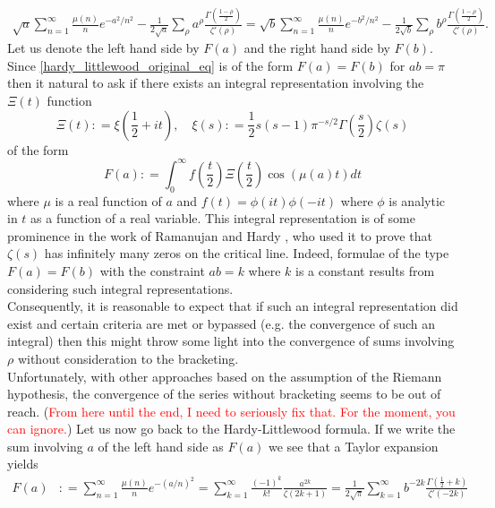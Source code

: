 \documentclass[11pt]{article}
\numberwithin{equation}{section}		 			%
\numberwithin{figure}{section}			 			%
\begin{document}
\begin{align} \label{dixit_equivalent}
\sqrt a \sum\limits_{n = 1}^\infty  {\frac{{\mu (n)}}
{n}e^{ - a^2 /n^2 } }  - \frac{1}
{{2\sqrt a }}\sum\limits_\rho  {a^\rho  \frac{{\Gamma (\tfrac{{1 - \rho }}
{2})}}
{{\zeta '(\rho )}}}  = \sqrt b \sum\limits_{n = 1}^\infty  {\frac{{\mu (n)}}
{n}e^{ - b^2 /n^2 } }  - \frac{1}
{{2\sqrt b }}\sum\limits_\rho  {b^\rho  \frac{{\Gamma (\tfrac{{1 - \rho }}
{2})}}
{{\zeta '(\rho )}}}.
\end{align}
Let us denote the left hand side by $F(a)$ and the right hand side by $F(b)$. Since \eqref{hardy_littlewood_original_eq} is of the form $F(a)=F(b)$ for $ab = \pi$ then it natural to ask if there exists an integral representation involving the $\Xi(t)$ function
\[
\Xi (t): = \xi \left( {\frac{1}
{2} + it} \right),\quad \xi (s): = \frac{1}
{2}s(s - 1)\pi ^{ - s/2} \Gamma \left( {\frac{s}
{2}} \right)\zeta (s)
\]
of the form
\[
F(a): = \int_0^\infty  {f\left( {\frac{t}
{2}} \right)\Xi \left( {\frac{t}
{2}} \right)\cos (\mu (a)t)dt} 
\]
where $\mu$ is a real function of $a$ and $f(t)=\phi(it)\phi(-it)$ where $\phi$ is analytic in $t$ as a function of a real variable. This integral representation is of some prominence in the work of Ramanujan \cite{ramanujan_32} and Hardy \cite{hardy}, \cite{titchmarsh} who used it to prove that $\zeta(s)$ has infinitely many zeros on the critical line. Indeed, formulae of the type $F(a)=F(b)$ with the constraint $ab = k$ where $k$ is a constant results from considering such integral representations.\\
Consequently, it is reasonable to expect that if such an integral representation did exist and certain criteria are met or bypassed (e.g. the convergence of such an integral) then this might \cite{dixit_1} throw some light into the convergence of sums involving $\rho$ without consideration to the bracketing.\\
Unfortunately, with other approaches \cite{hardy_littlewood} based on the assumption of the Riemann hypothesis, the convergence of the series without bracketing seems to be out of reach.
(\textcolor{red}{From here until the end, I need to seriously fix that. For the moment, you can ignore.}) Let us now go back to the Hardy-Littlewood formula. If we write the sum involving $a$ of the left hand side as $F(a)$ we see that a Taylor expansion yields
\begin{align} \label{derivative_minus_even_integers}
  F(a) &: = \sum\limits_{n = 1}^\infty  {\frac{{\mu (n)}}
{n}e^{ - (a/n)^2 } } = \sum\limits_{k = 1}^\infty  {\frac{{( - 1)^k }}
{{k!}}\frac{{a^{2k} }}
{{\zeta (2k + 1)}}}  = \frac{1}
{{2\sqrt \pi  }}\sum\limits_{k = 1}^\infty  {b^{ - 2k} \frac{{\Gamma (\tfrac{1}
{2} + k)}}
{{\zeta '( - 2k)}}}   
\end{align}
\end{document}
